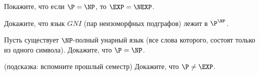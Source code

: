 \begin{task}
   Покажите, что если $\P = \NP$, то $\EXP = \NEXP$. 
\end{task}

\begin{task}
	Докажите, что язык $GNI$ (пар неизоморфных подграфов) лежит в $\P^{\NP}$.
\end{task}

\begin{task}
    Пусть существует $\NP$-полный унарный язык (все слова которого, состоят только из одного символа). Докажите, что $\P = \NP$.
\end{task}


\begin{task} (подсказка: вспомните прошлый семестр)
    Докажите, что $\P \neq \EXP$.
\end{task}


